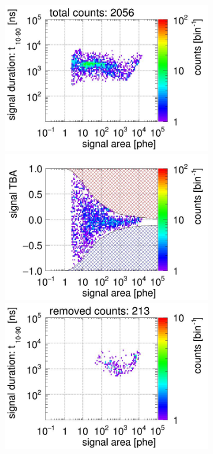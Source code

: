 \begin{landscape}
\begin{figure}[!p]
\begin{subfigure}[t]{0.33\textwidth}
			\includegraphics[width=\figurewidth,clip,trim={0 98 0 0}]{Figures/GasTest/CutsValid/res64767/pdpa10Vecfig64767.jpg}
			\includegraphics[width=\figurewidth,clip,trim={0 98 0 40}]{Figures/GasTest/CutsValid/res64767/tbapa10Vecfig64767.jpg}
			\includegraphics[width=\figurewidth,clip,trim={0 98 0 10}]{Figures/GasTest/CutsValid/res64767/pdpaX10Vecfig64767.jpg}

\end{subfigure}
\end{figure}
\end{landscape}
